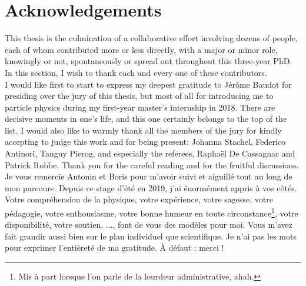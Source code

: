 \chapter*{Acknowledgements}

This thesis is the culmination of a collaborative effort involving dozens of people, each of whom contributed more or less directly, with a major or minor role, knowingly or not, spontaneously or spread out throughout this three-year PhD. In this section, I wish  to thank each and every one of these contributors.\\

I would like first to start to express my deepest gratitude to Jérôme Baudot for presiding over the jury of this thesis, but most of all for introducing me to particle physics during my first-year master's internship in 2018. There are decisive moments in one's life, and this one certainly belongs to the top of the list. I would also like to warmly thank all the members of the jury for kindly accepting to judge this work and for being present: Johanna Stachel, Federico Antinori, Tanguy Pierog, and especially the referees, Raphaël De Cassagnac and Patrick Robbe. Thank you for the careful reading and for the fruitful discussions. \\

Je vous remercie Antonin et Boris pour m'avoir suivi et aiguillé tout au long de mon parcours. Depuis ce stage d'été en 2019, j'ai énormément appris à vos côtés. Votre compréhension de la physique, votre expérience, votre sagesse, votre pédagogie, votre enthousiasme, votre bonne humeur en toute circonstance\footnote{Mis à part lorsque l'on parle de la lourdeur administrative, ahah.}, votre disponibilité, votre soutien, ..., font de vous des modèles pour moi. Vous m'avez fait grandir aussi bien sur le plan individuel que scientifique. Je n'ai pas les mots pour exprimer l'entièreté de ma gratitude. \`A défaut : merci !\\

